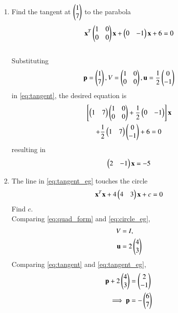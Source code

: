 \renewcommand{\theequation}{\theenumi}
\begin{enumerate}[label=\arabic*.,ref=\thesubsection.\theenumi]

\item Find the tangent at $\begin{pmatrix}1 \\ 7\end{pmatrix}$ to the parabola
\begin{equation}
\mathbf{x}^T\begin{pmatrix}1 & 0 \\ 0 & 0\end{pmatrix}\mathbf{x} + \begin{pmatrix}0 & -1\end{pmatrix}\mathbf{x} + 
6 = 0
\end{equation}
\\
\solution Substituting
\begin{equation}
\mathbf{p} = \begin{pmatrix}1 \\ 7\end{pmatrix}, V = \begin{pmatrix}1 & 0 \\ 0 & 0\end{pmatrix}, \mathbf{u} = \frac{1}{2}\begin{pmatrix}0 \\ -1\end{pmatrix}
\end{equation}
%
in \eqref{eq:tangent}, the desired equation is
\begin{multline}
{}\left[\begin{pmatrix} 1 & 7\end{pmatrix}\begin{pmatrix}1 & 0 \\ 0 & 0\end{pmatrix}+\frac{1}{2}\begin{pmatrix}0 & -1\end{pmatrix}\right]\mathbf{x} 
\\
+ \frac{1}{2}\begin{pmatrix} 1 & 7\end{pmatrix}\begin{pmatrix}0 \\
-1\end{pmatrix} 
+6 = 0
\end{multline}
resulting in
\begin{equation}
\begin{pmatrix} 2 & -1\end{pmatrix}\mathbf{x} 
 = -5
\label{eq:tangent_eg}
\end{equation}
\item The line in \eqref{eq:tangent_eg}
touches the circle
\begin{equation}
\mathbf{x}^T\mathbf{x} + 4 \begin{pmatrix}4 & 3\end{pmatrix}\mathbf{x} + c = 0
\label{eq:circle_eg}
\end{equation}
Find $c$.
\\
\solution Comparing \eqref{eq:quad_form} and \eqref{eq:circle_eg},
\begin{align}
\begin{split}
V &= I,
\\
\mathbf{u} &= 2 \begin{pmatrix}4 \\ 3\end{pmatrix}
\end{split}
\end{align}
%
Comparing \eqref{eq:tangent} and \eqref{eq:tangent_eg},
\begin{align}
\vec{p}+2 \myvec{4 \\ 3} &= \myvec{2 \\ -1}
\\
\implies \vec{p} &= -\myvec{6 \\ 7}

\end{align}
\end{enumerate}
